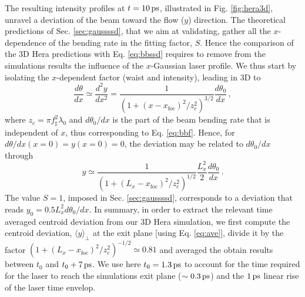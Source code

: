 \documentclass[%
 reprint,
 amsmath,amssymb,
 aps,
]{revtex4-1}
\begin{document}
The resulting intensity profiles at $t=10\, \rm ps$, illustrated in Fig. \ref{fig:hera3d}, unravel a deviation of the beam toward the flow ($y$) direction. 
The theoretical predictions of Sec.  \ref{sec:gaussssd}, that we aim at validating, gather all the $x$-dependence of the bending rate in the fitting factor, $S$. Hence the comparison of the 3D Hera predictions with Eq. \eqref{eq:bbssd} requires to remove from the simulations results the influence of the $x$-Gaussian laser profile. 
%
We thus start by isolating the $x$-dependent factor (waist and intensity), leading in 3D to 
\begin{equation}
    \frac{d \theta}{ dx} \simeq \frac{d^2y}{dx^2} = \frac{1}{(1+(x-x_\mathrm{foc})^2/z_c^2)^{3/2}} \frac{d\theta_0 }{dx} \, ,
\end{equation}
where $z_c=\pi f_\sharp^2 \lambda_0$ and $d\theta_0 /dx $  is the part of the beam bending rate that is independent of $x$, thus corresponding to Eq. \eqref{eq:bbf}.
Hence, for $d\theta/dx(x=0) = y(x=0)=0$, the deviation may be related to $d\theta_0 /dx $ through 
\begin{equation}
    y \simeq \frac{1}{(1+(L_x-x_\mathrm{foc})^2/z_c^2)^{1/2}} \frac{L_x^2}{2} \frac{d\theta_0 }{dx}\, .
\end{equation}
The value $S=1$, imposed in   Sec.  \ref{sec:gaussssd},  corresponds to a deviation that reads $y_0 = 0.5L_x^2d\theta_0 /dx$.
In summary, in order to extract the relevant time averaged centroid deviation from our 3D Hera simulation, we first compute the centroid deviation, $\langle y \rangle_\perp$ at the exit plane [using Eq. \eqref{eq:ave}], divide it by the factor  $(1+(L_x-x_\mathrm{foc})^2/z_c^2)^{-1/2}\simeq 0.81$ and averaged the obtain results between $t_0$  and $t_0+7\, \rm ps$. We use here  $t_0=1.3 \, \rm ps$  to account for the time required for the laser to reach the simulations exit plane ($\sim 0.3\,\rm ps$) and the $1\, \rm ps$ linear rise of the laser time envelop. 
\end{document}
